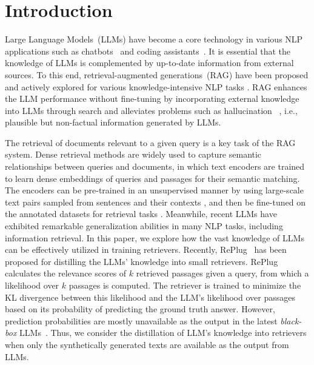 \section{Introduction}
Large Language Models~(LLMs) have become a core technology in various NLP applications such as chatbots~\cite{achiam2023gpt, team2023gemini} and coding assistants~\cite{roziere2023code, guo2024deepseek}. 
It is essential that the knowledge of LLMs is complemented by up-to-date information from external sources. To this end, retrieval-augmented generations~(RAG) have been proposed and actively explored for various knowledge-intensive NLP tasks  \cite{lewis2020retrieval, guu2020retrieval, lazaridou2022internet}. RAG enhances the LLM performance without fine-tuning by incorporating external knowledge into LLMs through search and   alleviates problems such as hallucination  ~\cite{welleck2020neural}, i.e., plausible but non-factual information generated by LLMs. 

The retrieval of documents relevant to a given query is a key task of the RAG system.  Dense retrieval methods \cite{karpukhin2020dense,gao2022unsupervised} are widely used to capture semantic relationships between queries and documents, in which text encoders are trained to learn dense embeddings of queries and passages for their semantic matching.
The encoders can be pre-trained in an unsupervised manner by using large-scale text pairs sampled from sentences and their contexts \cite{lee2019latent, izacard2021unsupervised}, and then be fine-tuned on the annotated datasets for retrieval tasks \cite{wang2022text, chen2024bge}.
Meanwhile, recent LLMs have exhibited remarkable generalization abilities in many NLP tasks, including information retrieval. 
In this paper, we explore how the vast knowledge of LLMs can be effectively utilized in training retrievers.
Recently, RePlug~\cite{shi2024replug} has been proposed for distilling the LLMs' knowledge into small retrievers. RePlug calculates the relevance scores of $k$ retrieved passages given a query, from which a likelihood over $k$ passages is computed. The retriever is trained to minimize the KL divergence between this likelihood and the LLM's likelihood over passages based on its probability of predicting the ground truth answer. However, prediction probabilities are mostly unavailable as the output in the latest \emph{black-box} 
LLMs~\cite{achiam2023gpt, team2023gemini}. Thus, we consider the distillation of LLM's knowledge into retrievers when only the synthetically generated texts are available as the output from LLMs. 


